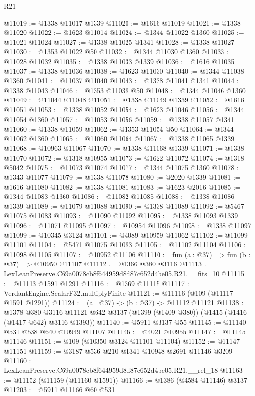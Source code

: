 \begin{lexlean}{R21}
\begin{coremodule}
@11019 := @1338 @11017 @1339
@11020 := @1616 @11019
@11021 := @1338 @11020
@11022 := @1623 @11014
@11024 := @1344 @11022 @1360
@11025 := @11021 @11024
@11027 := @1338 @11025 @1341
@11028 := @1338 @11027
@11030 := @1353 @11022 @50
@11032 := @1344 @11030 @1360
@11033 := @11028 @11032
@11035 := @1338 @11033 @1339
@11036 := @1616 @11035
@11037 := @1338 @11036
@11038 := @1623 @11030
@11040 := @1344 @11038 @1360
@11041 := @11037 @11040
@11043 := @1338 @11041 @1341
@11044 := @1338 @11043
@11046 := @1353 @11038 @50
@11048 := @1344 @11046 @1360
@11049 := @11044 @11048
@11051 := @1338 @11049 @1339
@11052 := @1616 @11051
@11053 := @1338 @11052
@11054 := @1623 @11046
@11056 := @1344 @11054 @1360
@11057 := @11053 @11056
@11059 := @1338 @11057 @1341
@11060 := @1338 @11059
@11062 := @1353 @11054 @50
@11064 := @1344 @11062 @1360
@11065 := @11060 @11064
@11067 := @1338 @11065 @1339
@11068 := @10963 @11067
@11070 := @1338 @11068 @1339
@11071 := @1338 @11070
@11072 := @1318 @10955
@11073 := @1622 @11072
@11074 := @1318 @5042
@11075 := @11073 @11074
@11077 := @1344 @11075 @1360
@11078 := @1343 @11077
@11079 := @1338 @11078
@11080 := @2020 @1339
@11081 := @1616 @11080
@11082 := @1338 @11081
@11083 := @1623 @2016
@11085 := @1344 @11083 @1360
@11086 := @11082 @11085
@11088 := @1338 @11086 @1339
@11089 := @11079 @11088
@11090 := @1338 @11089
@11092 := @5467 @11075 @11083
@11093 := @11090 @11092
@11095 := @1338 @11093 @1339
@11096 := @11071 @11095
@11097 := @10954 @11096
@11098 := @1338 @11097
@11099 := @10345 @3124
@11101 := @4089 @10959 @11062
@11102 := @11099 @11101
@11104 := @5471 @11075 @11083
@11105 := @11102 @11104
@11106 := @11098 @11105
@11107 := @10952 @11106
@11110 := fun (a : @37) => fun (b : @37) => @10950 @11107
@11112 := @1366 @380 @3116
@11113 := LexLeanPreserve.C69a0078cb8f644959d8d87c652d4be05.R21.__fits_10
@11115 := @11113 @1591 @1291
@11116 := @1369 @11115
@11117 := VerdantEngine.ScalarF32.multiplyFinite
@11121 := @11116 (@109 (@11117 @1591 @1291))
@11124 := (a : @37) -> (b : @37) -> @11112 @11121
@11138 := @1378
    @380
    @3116
    @11121
    @642
    @3137
    (@1399 (@1409 @380))
    (@1415 (@1416 (@1417 @642) @3116 @1393))
@11140 := @5911 @3137 @55
@11145 := @11140 @531 @538 @640 @10949 @11107
@11146 := @4021 @10955
@11147 := @11145 @11146
@11151 := @109 (@10350 @3124 @11101 @11104)
@11152 := @11147 @11151
@11159 := @3187 @536 @210 @1341 @10948 @2691 @11146 @3209
@11160 := LexLeanPreserve.C69a0078cb8f644959d8d87c652d4be05.R21.__rel_18
@11163 := @11152 (@11159 (@11160 @1591))
@11166 := @1386 (@4584 @11146) @3137
@11203 := @5911
    @11166
    @60
    @531

\end{coremodule}
\end{lexlean}
